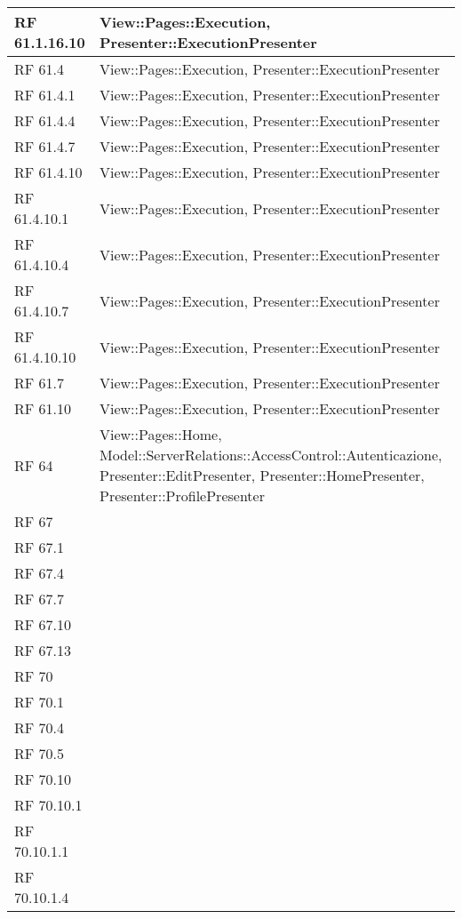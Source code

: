 {\begin{longtable} [c]{| p{2cm} | p{14cm} |}
 \hline 
RF 61.1.16.10 & View::Pages::\-Execution, Presenter::\-ExecutionPresenter\\ 
 \hline 
RF 61.4 & View::Pages::\-Execution, Presenter::\-ExecutionPresenter\\ 
 \hline 
RF 61.4.1 & View::Pages::\-Execution, Presenter::\-ExecutionPresenter\\ 
 \hline 
RF 61.4.4 & View::Pages::\-Execution, Presenter::\-ExecutionPresenter\\ 
 \hline 
RF 61.4.7 & View::Pages::\-Execution, Presenter::\-ExecutionPresenter\\ 
 \hline 
RF 61.4.10 & View::Pages::\-Execution, Presenter::\-ExecutionPresenter\\ 
 \hline 
RF 61.4.10.1 & View::Pages::\-Execution, Presenter::\-ExecutionPresenter\\ 
 \hline 
RF 61.4.10.4 & View::Pages::\-Execution, Presenter::\-ExecutionPresenter\\ 
 \hline 
RF 61.4.10.7 & View::Pages::\-Execution, Presenter::\-ExecutionPresenter\\ 
 \hline 
RF 61.4.10.10 & View::Pages::\-Execution, Presenter::\-ExecutionPresenter\\ 
 \hline 
RF 61.7 & View::Pages::\-Execution, Presenter::\-ExecutionPresenter\\ 
 \hline 
RF 61.10 & View::Pages::\-Execution, Presenter::\-ExecutionPresenter\\ 
 \hline 
RF 64 & View::Pages::\-Home, Model::ServerRelations::AccessControl::\-Autenticazione, Presenter::\-EditPresenter, Presenter::\-HomePresenter, Presenter::\-ProfilePresenter\\ 
 \hline 
RF 67 & \\ 
 \hline 
RF 67.1 & \\ 
 \hline 
RF 67.4 & \\ 
 \hline 
RF 67.7 & \\ 
 \hline 
RF 67.10 & \\ 
 \hline 
RF 67.13 & \\ 
 \hline 
RF 70 & \\ 
 \hline 
RF 70.1 & \\ 
 \hline 
RF 70.4 & \\ 
 \hline 
RF 70.5 & \\ 
 \hline 
RF 70.10 & \\ 
 \hline 
RF 70.10.1 & \\ 
 \hline 
RF 70.10.1.1 & \\ 
 \hline 
RF 70.10.1.4 & \\ 
 \hline 

\end{longtable}}
